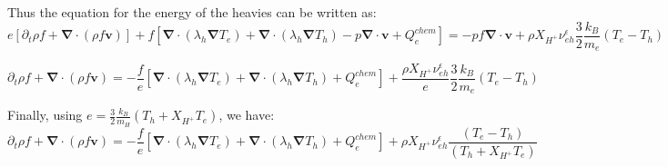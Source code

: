 \documentclass[11pt, oneside]{article}   	%
\begin{document}
Thus the equation for the energy of the heavies can be written as:
\[ e\left[\partial_t \rho f + \boldsymbol{\nabla}\cdot(\rho f \boldsymbol{v})\right] + f \left[ \boldsymbol{\nabla}\cdot(\lambda_h\boldsymbol{\nabla}T_e) + \boldsymbol{\nabla}\cdot(\lambda_h\boldsymbol{\nabla}T_h) - p\boldsymbol{\nabla}\cdot\boldsymbol{v} + Q_e^{chem} \right] =- p f \boldsymbol{\nabla}\cdot \boldsymbol{v} + \rho X_{H^+}\nu_{eh}^\epsilon \frac{3}{2}\frac{k_B}{m_e}(T_e - T_h) \]

\[ \partial_t \rho f + \boldsymbol{\nabla}\cdot(\rho f \boldsymbol{v}) = - \frac{f}{e} \left[ \boldsymbol{\nabla}\cdot(\lambda_h\boldsymbol{\nabla}T_e) + \boldsymbol{\nabla}\cdot(\lambda_h\boldsymbol{\nabla}T_h) + Q_e^{chem} \right] + \frac{\rho X_{H^+}\nu_{eh}^\epsilon}{e}\frac{3}{2}\frac{k_B}{m_e}(T_e - T_h) \]

Finally, using $e = \frac{3}{2}\frac{k_B}{m_H}(T_h + X_{H^+}T_e)$, we have:
\[ \partial_t \rho f + \boldsymbol{\nabla}\cdot(\rho f \boldsymbol{v}) = - \frac{f}{e} \left[ \boldsymbol{\nabla}\cdot(\lambda_h\boldsymbol{\nabla}T_e) + \boldsymbol{\nabla}\cdot(\lambda_h\boldsymbol{\nabla}T_h) + Q_e^{chem} \right] + \rho X_{H^+}\nu_{eh}^\epsilon \frac{(T_e - T_h)}{(T_h + X_{H^+}T_e)} \]
\end{document}
